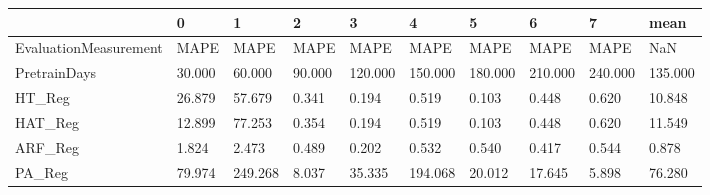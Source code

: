 \begin{tabular}{llllllllll}
\toprule
{} &       0 &        1 &       2 &        3 &        4 &        5 &        6 &        7 &     mean \\
\midrule
EvaluationMeasurement &    MAPE &     MAPE &    MAPE &     MAPE &     MAPE &     MAPE &     MAPE &     MAPE &      NaN \\
PretrainDays          &  30.000 &   60.000 &  90.000 &  120.000 &  150.000 &  180.000 &  210.000 &  240.000 &  135.000 \\
HT\_Reg                &  26.879 &   57.679 &   0.341 &    0.194 &    0.519 &    0.103 &    0.448 &    0.620 &   10.848 \\
HAT\_Reg               &  12.899 &   77.253 &   0.354 &    0.194 &    0.519 &    0.103 &    0.448 &    0.620 &   11.549 \\
ARF\_Reg               &   1.824 &    2.473 &   0.489 &    0.202 &    0.532 &    0.540 &    0.417 &    0.544 &    0.878 \\
PA\_Reg                &  79.974 &  249.268 &   8.037 &   35.335 &  194.068 &   20.012 &   17.645 &    5.898 &   76.280 \\
\bottomrule
\end{tabular}
